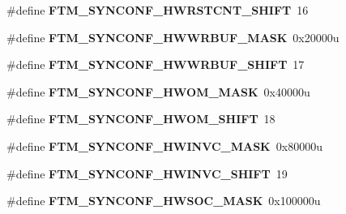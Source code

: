\begin{DoxyCompactItemize}
\item 
\hypertarget{group___f_t_m___register___masks_gae0f2be27abcc3ae202f10bb3d27a4dc7}{}\#define {\bfseries F\+T\+M\+\_\+\+S\+Y\+N\+C\+O\+N\+F\+\_\+\+H\+W\+R\+S\+T\+C\+N\+T\+\_\+\+S\+H\+I\+F\+T}~16\label{group___f_t_m___register___masks_gae0f2be27abcc3ae202f10bb3d27a4dc7}

\item 
\hypertarget{group___f_t_m___register___masks_ga6191e61768074435e48f3e3d07076d0f}{}\#define {\bfseries F\+T\+M\+\_\+\+S\+Y\+N\+C\+O\+N\+F\+\_\+\+H\+W\+W\+R\+B\+U\+F\+\_\+\+M\+A\+S\+K}~0x20000u\label{group___f_t_m___register___masks_ga6191e61768074435e48f3e3d07076d0f}

\item 
\hypertarget{group___f_t_m___register___masks_gadad6b0aa720155c8c4b689e63a86466a}{}\#define {\bfseries F\+T\+M\+\_\+\+S\+Y\+N\+C\+O\+N\+F\+\_\+\+H\+W\+W\+R\+B\+U\+F\+\_\+\+S\+H\+I\+F\+T}~17\label{group___f_t_m___register___masks_gadad6b0aa720155c8c4b689e63a86466a}

\item 
\hypertarget{group___f_t_m___register___masks_gac4c190aeac6b3ca490b9a693350c6ec6}{}\#define {\bfseries F\+T\+M\+\_\+\+S\+Y\+N\+C\+O\+N\+F\+\_\+\+H\+W\+O\+M\+\_\+\+M\+A\+S\+K}~0x40000u\label{group___f_t_m___register___masks_gac4c190aeac6b3ca490b9a693350c6ec6}

\item 
\hypertarget{group___f_t_m___register___masks_ga64d72753d3b6dee9b83125cfba66b52a}{}\#define {\bfseries F\+T\+M\+\_\+\+S\+Y\+N\+C\+O\+N\+F\+\_\+\+H\+W\+O\+M\+\_\+\+S\+H\+I\+F\+T}~18\label{group___f_t_m___register___masks_ga64d72753d3b6dee9b83125cfba66b52a}

\item 
\hypertarget{group___f_t_m___register___masks_ga84bc991db330a6933bc0a3b89ed8b85f}{}\#define {\bfseries F\+T\+M\+\_\+\+S\+Y\+N\+C\+O\+N\+F\+\_\+\+H\+W\+I\+N\+V\+C\+\_\+\+M\+A\+S\+K}~0x80000u\label{group___f_t_m___register___masks_ga84bc991db330a6933bc0a3b89ed8b85f}

\item 
\hypertarget{group___f_t_m___register___masks_gae14e244f2072efc59ef7919e4675a988}{}\#define {\bfseries F\+T\+M\+\_\+\+S\+Y\+N\+C\+O\+N\+F\+\_\+\+H\+W\+I\+N\+V\+C\+\_\+\+S\+H\+I\+F\+T}~19\label{group___f_t_m___register___masks_gae14e244f2072efc59ef7919e4675a988}

\item 
\hypertarget{group___f_t_m___register___masks_ga87dd113da8487aa3082d39baeb54874d}{}\#define {\bfseries F\+T\+M\+\_\+\+S\+Y\+N\+C\+O\+N\+F\+\_\+\+H\+W\+S\+O\+C\+\_\+\+M\+A\+S\+K}~0x100000u\label{group___f_t_m___register___masks_ga87dd113da8487aa3082d39baeb54874d}


\end{DoxyCompactItemize}
